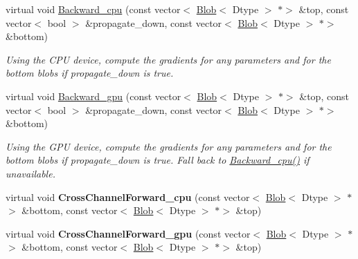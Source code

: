\begin{DoxyCompactItemize}
virtual void \mbox{\hyperlink{classcaffe_1_1_l_r_n_layer_a6d83c9f40b7504e16909b72b3f35f620}{Backward\+\_\+cpu}} (const vector$<$ \mbox{\hyperlink{classcaffe_1_1_blob}{Blob}}$<$ Dtype $>$ $\ast$$>$ \&top, const vector$<$ bool $>$ \&propagate\+\_\+down, const vector$<$ \mbox{\hyperlink{classcaffe_1_1_blob}{Blob}}$<$ Dtype $>$ $\ast$$>$ \&bottom)
\begin{DoxyCompactList}\small\item\em Using the C\+PU device, compute the gradients for any parameters and for the bottom blobs if propagate\+\_\+down is true. \end{DoxyCompactList}\item 
\mbox{\label{classcaffe_1_1_l_r_n_layer_a11e0ab3313651275345a043bf2321f95}} 
virtual void \mbox{\hyperlink{classcaffe_1_1_l_r_n_layer_a11e0ab3313651275345a043bf2321f95}{Backward\+\_\+gpu}} (const vector$<$ \mbox{\hyperlink{classcaffe_1_1_blob}{Blob}}$<$ Dtype $>$ $\ast$$>$ \&top, const vector$<$ bool $>$ \&propagate\+\_\+down, const vector$<$ \mbox{\hyperlink{classcaffe_1_1_blob}{Blob}}$<$ Dtype $>$ $\ast$$>$ \&bottom)
\begin{DoxyCompactList}\small\item\em Using the G\+PU device, compute the gradients for any parameters and for the bottom blobs if propagate\+\_\+down is true. Fall back to \mbox{\hyperlink{classcaffe_1_1_l_r_n_layer_ac3f419feedaf79fc42d79af0d0f530ef}{Backward\+\_\+cpu()}} if unavailable. \end{DoxyCompactList}\item 
\mbox{\label{classcaffe_1_1_l_r_n_layer_a61ba9e0061ae7cec2bc09393fab9229a}} 
virtual void {\bfseries Cross\+Channel\+Forward\+\_\+cpu} (const vector$<$ \mbox{\hyperlink{classcaffe_1_1_blob}{Blob}}$<$ Dtype $>$ $\ast$$>$ \&bottom, const vector$<$ \mbox{\hyperlink{classcaffe_1_1_blob}{Blob}}$<$ Dtype $>$ $\ast$$>$ \&top)
\item 
\mbox{\label{classcaffe_1_1_l_r_n_layer_aa73f0b95b69aac2ee47be1e48756feeb}} 
virtual void {\bfseries Cross\+Channel\+Forward\+\_\+gpu} (const vector$<$ \mbox{\hyperlink{classcaffe_1_1_blob}{Blob}}$<$ Dtype $>$ $\ast$$>$ \&bottom, const vector$<$ \mbox{\hyperlink{classcaffe_1_1_blob}{Blob}}$<$ Dtype $>$ $\ast$$>$ \&top)
\item 
\mbox{\label{classcaffe_1_1_l_r_n_layer_aaf5113a768004cadbf6eb23dcadca746}} 

\end{DoxyCompactItemize}
